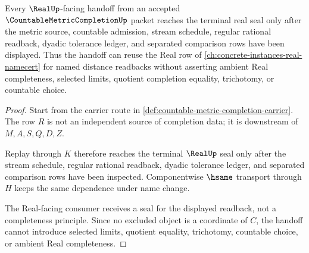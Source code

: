 \begin{theorem}
\label{thm:countable-metric-completion-real-handoff}
Every $\RealUp$-facing handoff from an accepted $\CountableMetricCompletionUp$ packet reaches the terminal real seal only after the metric source, countable admission, stream schedule, regular rational readback, dyadic tolerance ledger, and separated comparison rows have been displayed. Thus the handoff can reuse the Real row of \autoref{ch:concrete-instances-real-namecert} for named distance readbacks without asserting ambient Real completeness, selected limits, quotient completion equality, trichotomy, or countable choice.
\end{theorem}
\begin{proof}
Start from the carrier route in \autoref{def:countable-metric-completion-carrier}. The row $R$ is not an independent source of completion data; it is downstream of $M,A,S,Q,D,Z$.

Replay through $K$ therefore reaches the terminal $\RealUp$ seal only after the stream schedule, regular rational readback, dyadic tolerance ledger, and separated comparison rows have been inspected. Componentwise $\hsame$ transport through $H$ keeps the same dependence under name change.

The Real-facing consumer receives a seal for the displayed readback, not a completeness principle. Since no excluded object is a coordinate of $C$, the handoff cannot introduce selected limits, quotient equality, trichotomy, countable choice, or ambient Real completeness.
\end{proof}

